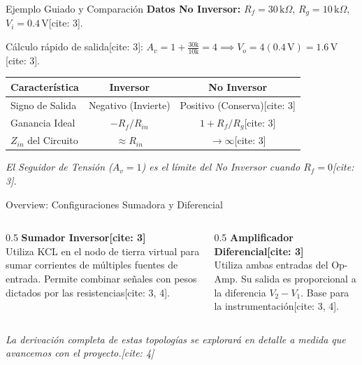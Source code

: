 \documentclass[aspectratio=169, table, xcdraw]{beamer}
\begin{document}
\begin{frame}{Ejemplo Guiado y Comparación}
    \textbf{Datos No Inversor:} $R_f = 30\,\text{k}\Omega$, $R_g = 10\,\text{k}\Omega$, $V_i = 0.4\,\text{V}$[cite: 3].
    
    Cálculo rápido de salida[cite: 3]: 
    $A_v = 1 + \frac{30\text{k}}{10\text{k}} = 4 \implies V_o = 4(0.4\,\text{V}) = \boxed{1.6\,\text{V}}$[cite: 3].

    \vspace{0.4cm}
    \begin{table}[]
        \centering
        \renewcommand{\arraystretch}{1.3}
        \begin{tabular}{lcc}
        \toprule
        \rowcolor[HTML]{EFEFEF}
        \textbf{Característica} & \textbf{Inversor} & \textbf{No Inversor} \\ \midrule
        Signo de Salida & Negativo (Invierte) & Positivo (Conserva)[cite: 3] \\
        Ganancia Ideal & $-R_f/R_{in}$ & $1 + R_f/R_g$[cite: 3] \\
        $Z_{in}$ del Circuito & $\approx R_{in}$ & $\rightarrow \infty$[cite: 3] \\
        \bottomrule
        \end{tabular}
    \end{table}
    \textit{El Seguidor de Tensión ($A_v = 1$) es el límite del No Inversor cuando $R_f = 0$[cite: 3].}
\end{frame}

\begin{frame}{Overview: Configuraciones Sumadora y Diferencial}
    \begin{columns}
        \begin{column}{0.5\textwidth}
            \textbf{Sumador Inversor[cite: 3]} \\
            \footnotesize
            Utiliza KCL en el nodo de tierra virtual para sumar corrientes de múltiples fuentes de entrada. 
            Permite combinar señales con pesos dictados por las resistencias[cite: 3, 4].
        \end{column}
        \begin{column}{0.5\textwidth}
            \textbf{Amplificador Diferencial[cite: 3]} \\
            \footnotesize
            Utiliza ambas entradas del Op-Amp. Su salida es proporcional a la diferencia $V_2 - V_1$. Base para la instrumentación[cite: 3, 4].
        \end{column}
    \end{columns}
    \vspace{0.4cm}
    \begin{center}
        \textit{La derivación completa de estas topologías se explorará en detalle a medida que avancemos con el proyecto.[cite: 4]}
    \end{center}
\end{frame}
\end{document}
